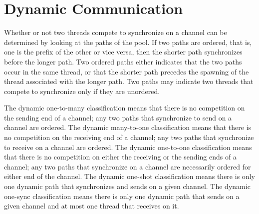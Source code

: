 \documentclass[letterpaper, 11pt]{report}
\begin{document}
\section{Dynamic Communication}

Whether or not two threads compete to
synchronize on a channel can be determined by
looking at the paths of the pool. If two paths are ordered, that is, one is the
prefix of the other or vice versa, then the shorter path synchronizes before the longer path.
Two ordered paths either indicates that the two paths occur in the same thread, or
that the shorter path precedes the spawning of the thread associated with the longer path.
Two paths may indicate two threads that compete to synchronize only if they are unordered.

The dynamic one-to-many classification means that there
is no competition on the sending end of a channel; any two paths that synchronize to
send on a channel are ordered.
The dynamic many-to-one classification means that
there is no competition on the receiving end of a channel; any two paths that synchronize to
receive on a channel are ordered.
The dynamic one-to-one classification means that there is no
competition on either the receiving or the sending ends of a channel; any two paths that
synchronize on a channel are necessarily ordered for either end of the channel. 
The dynamic one-shot classification means there is only one dynamic path
that synchronizes and sends on a given channel. The dynamic one-sync classification means
there is only one dynamic path that sends on a given channel and at most one thread
that receives on it.
\end{document}
